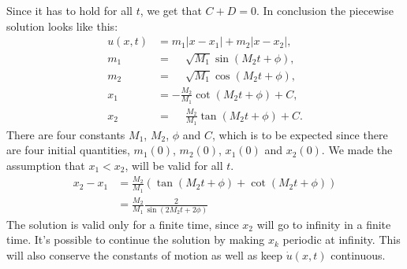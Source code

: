 \documentclass[english,master]{liumaiex}
\theoremstyle{plain}
\theoremstyle{definition}
\begin{document}
%
Since it has to hold for all $t$, we get that $C + D = 0$.
In conclusion the piecewise solution looks like this:
\begin{align}
	u(x, t) &= m_1|x - x_1| + m_2|x - x_2|, \\
	m_1 &= \phantom{-}\sqrt{M_1} \sin(M_2t + \phi), \\
	m_2 &= \phantom{-}\sqrt{M_1} \cos(M_2t + \phi), \\
	x_1 &= -\frac{M_2}{M_1}\cot(M_2t + \phi) + C, \\
	x_2 &= \phantom{-}\frac{M_2}{M_1}\tan(M_2t + \phi) + C.
\end{align}
%
There are four constants $M_1$, $M_2$, $\phi$ and $C$, which is to be expected since there are four initial quantities, $m_1(0)$, $m_2(0)$, $x_1(0)$ and $x_2(0)$. We made the assumption that $x_1 < x_2$, will be valid for all $t$.
\begin{equation}
\begin{aligned}
	x_2 - x_1 
	&= \frac{M_2}{M_1}(\tan(M_2t + \phi) + \cot(M_2t + \phi)) \\
	&= \frac{M_2}{M_1}\frac{2}{\sin(2M_2t + 2\phi)}
\end{aligned}
\end{equation}
The solution is valid only for a finite time, since $x_2$ will go to infinity in a finite time. It's possible to continue the solution by making $x_k$ periodic at infinity. This will also conserve the constants of motion as well as keep $\dot{u}(x, t)$ continuous.

\begin{center}
\end{center}
\end{document}
